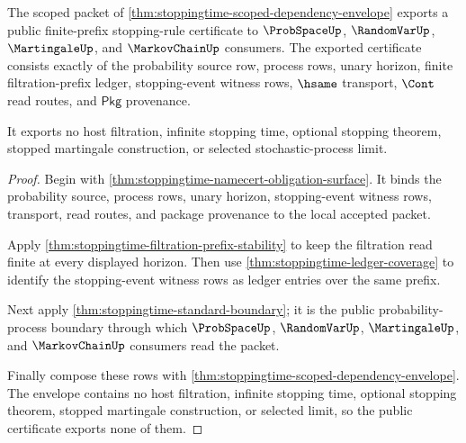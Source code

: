 \begin{theorem}\label{thm:stoppingtime-public-consumer-export}
The scoped packet of \autoref{thm:stoppingtime-scoped-dependency-envelope}
exports a public finite-prefix stopping-rule certificate to $\ProbSpaceUp$,
$\RandomVarUp$, $\MartingaleUp$, and $\MarkovChainUp$ consumers. The exported
certificate consists exactly of the probability source row, process rows, unary
horizon, finite filtration-prefix ledger, stopping-event witness rows, $\hsame$
transport, $\Cont$ read routes, and $\mathsf{Pkg}$ provenance.

It exports no host filtration, infinite stopping time, optional stopping
theorem, stopped martingale construction, or selected stochastic-process limit.
\end{theorem}
\begin{proof}
Begin with \autoref{thm:stoppingtime-namecert-obligation-surface}. It binds the
probability source, process rows, unary horizon, stopping-event witness rows,
transport, read routes, and package provenance to the local accepted packet.

Apply \autoref{thm:stoppingtime-filtration-prefix-stability} to keep the
filtration read finite at every displayed horizon. Then use
\autoref{thm:stoppingtime-ledger-coverage} to identify the stopping-event
witness rows as ledger entries over the same prefix.

Next apply \autoref{thm:stoppingtime-standard-boundary}; it is the public
probability-process boundary through which $\ProbSpaceUp$, $\RandomVarUp$,
$\MartingaleUp$, and $\MarkovChainUp$ consumers read the packet.

Finally compose these rows with
\autoref{thm:stoppingtime-scoped-dependency-envelope}. The envelope contains no
host filtration, infinite stopping time, optional stopping theorem, stopped
martingale construction, or selected limit, so the public certificate exports
none of them.
\end{proof}


